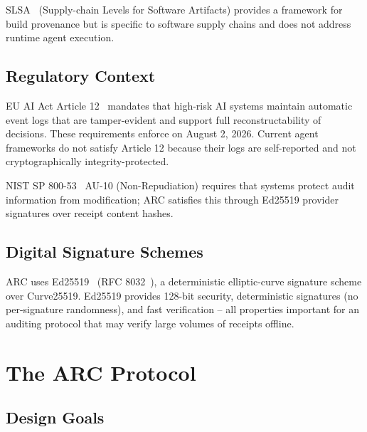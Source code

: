 \documentclass[10pt,twocolumn]{article}
\begin{document}
SLSA~\cite{slsa2023} (Supply-chain Levels for Software Artifacts) provides
a framework for build provenance but is specific to software supply chains
and does not address runtime agent execution.

\subsection{Regulatory Context}

EU AI Act Article 12~\cite{euaiact2024} mandates that high-risk AI systems
maintain automatic event logs that are tamper-evident and support full
reconstructability of decisions. These requirements enforce on August 2, 2026.
Current agent frameworks do not satisfy Article 12 because their logs are
self-reported and not cryptographically integrity-protected.

NIST SP 800-53~\cite{nist80053} AU-10 (Non-Repudiation) requires that systems
protect audit information from modification; ARC satisfies this through
Ed25519 provider signatures over receipt content hashes.

\subsection{Digital Signature Schemes}

ARC uses Ed25519~\cite{ed25519} (RFC 8032~\cite{rfc8032}), a deterministic
elliptic-curve signature scheme over Curve25519. Ed25519 provides 128-bit
security, deterministic signatures (no per-signature randomness), and
fast verification -- all properties important for an auditing protocol that
may verify large volumes of receipts offline.

\section{The ARC Protocol}

\subsection{Design Goals}
\end{document}
